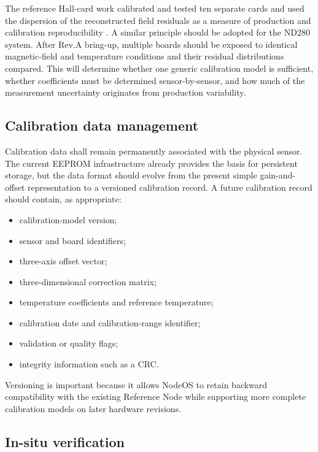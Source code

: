 The reference Hall-card work calibrated and tested ten separate cards and used the dispersion of the reconstructed field residuals as a measure of production and calibration reproducibility \cite{MessnerHallCalibration}. A similar principle should be adopted for the ND280 system. After Rev.A bring-up, multiple boards should be exposed to identical magnetic-field and temperature conditions and their residual distributions compared. This will determine whether one generic calibration model is sufficient, whether coefficients must be determined sensor-by-sensor, and how much of the measurement uncertainty originates from production variability.

\subsection{Calibration data management}

Calibration data shall remain permanently associated with the physical sensor. The current EEPROM infrastructure already provides the basis for persistent storage, but the data format should evolve from the present simple gain-and-offset representation to a versioned calibration record. A future calibration record should contain, as appropriate:

\begin{itemize}[leftmargin=*]
\item calibration-model version;
\item sensor and board identifiers;
\item three-axis offset vector;
\item three-dimensional correction matrix;
\item temperature coefficients and reference temperature;
\item calibration date and calibration-range identifier;
\item validation or quality flags;
\item integrity information such as a CRC.
\end{itemize}

Versioning is important because it allows NodeOS to retain backward compatibility with the existing Reference Node while supporting more complete calibration models on later hardware revisions.

\subsection{In-situ verification}

